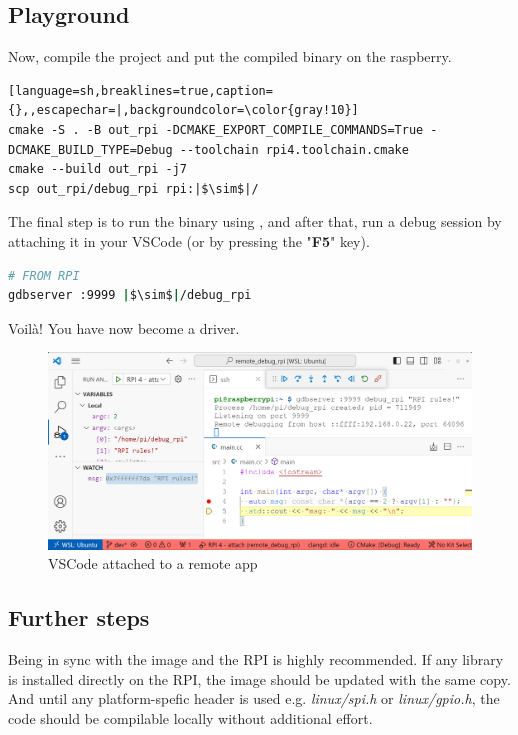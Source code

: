 \documentclass[twocolumn, 10pt]{article}
\begin{document}
\subsection*{Playground}
Now, compile the project and put the compiled binary on the raspberry.
\begin{lstlisting}[language=sh,breaklines=true,caption={},,escapechar=|,backgroundcolor=\color{gray!10}]
cmake -S . -B out_rpi -DCMAKE_EXPORT_COMPILE_COMMANDS=True -DCMAKE_BUILD_TYPE=Debug --toolchain rpi4.toolchain.cmake
cmake --build out_rpi -j7
scp out_rpi/debug_rpi rpi:|$\sim$|/
\end{lstlisting}

The final step is to run the binary using , and after that, run a debug session by attaching it in your VSCode (or by pressing the "\textbf{F5}" key).
\begin{lstlisting}[language=sh,breaklines=true,caption={},escapechar=|,backgroundcolor=\color{gray!10}]
# FROM RPI
gdbserver :9999 |$\sim$|/debug_rpi
\end{lstlisting}
Voilà! You have now become a driver.

\begin{figure}
  \includegraphics[width=\linewidth]{res/remote_debug_rpi_light.png}
  \caption*{VSCode attached to a remote app}
  \label{fig:debug}
\end{figure}

\subsection*{Further steps}
Being in sync with the image and the RPI is highly recommended.
  If any library is installed directly on the RPI, the image
  should be updated with the same copy. And until any platform-spefic header is used
  e.g. \mbox{\textit{linux/spi.h}} or \mbox{\textit{linux/gpio.h}}, the code should be compilable
  locally without additional effort.
\end{document}
